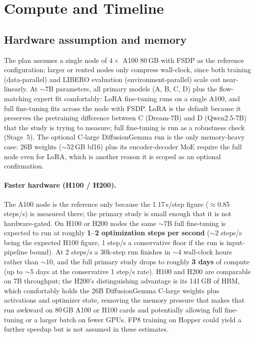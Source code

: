 \documentclass[11pt]{article}
\begin{document}
\section{Compute and Timeline}

\subsection{Hardware assumption and memory}

The plan assumes a single node of $4\times$ A100 80\,GB with FSDP as the reference configuration; larger or rented nodes only compress wall-clock, since both training (data-parallel) and LIBERO evaluation (environment-parallel) scale out near-linearly. At $\sim$7B parameters, all primary models (A, B, C, D) plus the flow-matching expert fit comfortably: LoRA fine-tuning runs on a single A100, and full fine-tuning fits across the node with FSDP. LoRA is the default because it preserves the pretraining difference between C (Dream-7B) and D (Qwen2.5-7B) that the study is trying to measure; full fine-tuning is run as a robustness check (Stage~5). The optional \mbox{C-large} DiffusionGemma run is the only memory-heavy case: 26B weights ($\sim$52\,GB bf16) plus its encoder-decoder MoE require the full node even for LoRA, which is another reason it is scoped as an optional confirmation.

\paragraph{Faster hardware (H100 / H200).} The A100 node is the reference only because the 1.17\,s/step figure ($\approx$0.85 steps/s) is measured there; the primary study is small enough that it is not hardware-gated. On H100 or H200 nodes the same $\sim$7B full fine-tuning is expected to run at roughly \textbf{1--2 optimization steps per second} ($\sim$2 steps/s being the expected H100 figure, 1 step/s a conservative floor if the run is input-pipeline bound). At 2 steps/s a 30k-step run finishes in $\sim$4 wall-clock hours rather than $\sim$10, and the full primary study drops to roughly \textbf{3 days} of compute (up to $\sim$5 days at the conservative 1 step/s rate). H100 and H200 are comparable on 7B throughput; the H200's distinguishing advantage is its 141\,GB of HBM, which comfortably holds the 26B DiffusionGemma \mbox{C-large} weights plus activations and optimizer state, removing the memory pressure that makes that run awkward on 80\,GB A100 or H100 cards and potentially allowing full fine-tuning or a larger batch on fewer GPUs. FP8 training on Hopper could yield a further speedup but is not assumed in these estimates.
\end{document}

